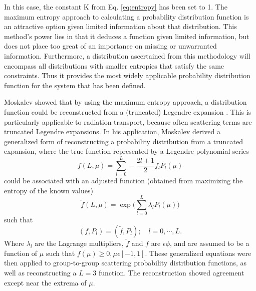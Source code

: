 In this case, the constant K from Eq. \eqref{eq:entropy} has been set to 1.
The maximum entropy approach to calculating a probability distribution function
is an attractive option given limited information about that
distribution. This method's power lies in that it
deduces a function given limited information, but does not place too great of an
importance on missing or unwarranted information. Furthermore, a distribution
ascertained from this methodology will encompass all distributions with smaller
entropies that satisfy the same constraints. Thus it provides the most widely
applicable probability distribution function for the system that has been
defined.

Moskalev showed that by using the maximum entropy approach, a distribution function
could be reconstructed from a (truncated) Legendre expansion
\cite{moskalev_reconstruction_1993}. This is particularly
applicable to radiation transport, because often scattering terms are truncated
Legendre expansions. In his application, Moskalev derived a generalized form of
reconstructing a probability distribution from a truncated expansion, where the
true function represented by a Legendre polynomial series
\begin{equation}
  f(L,\mu) = \sum_{l=0}^L -\frac{2l+1}{2} f_l P_l(\mu)
\end{equation}
could be associated with an adjusted function (obtained from maximizing the
entropy of the known values)
\begin{equation}
  \tilde{f}(L,\mu) = \exp \big( \sum_{l=0}^{L} \lambda_l P_l(\mu) \big)
\end{equation}
such that
\begin{equation}
  (f,P_l) = (\tilde{f}, P_l); \quad l = 0, \cdots, L .
\end{equation}
Where $\lambda_l$ are the Lagrange multipliers, $\tilde{f}$ and $f$ are
$\epsilon \phi$, and are assumed to be a function of $\mu$ such that $f(\mu)
\geq 0, \mu \epsilon [-1, 1]$.
These generalized equations were then applied to
group-to-group scattering probability distribution functions, as well as
reconstructing a $L=3$ function. The reconstruction showed agreement except near
the extrema of $\mu$.

